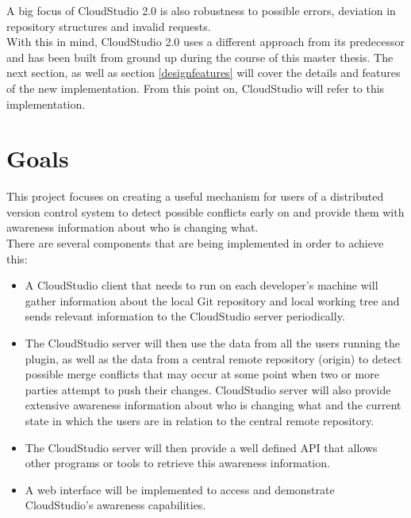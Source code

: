A big focus of CloudStudio 2.0 is also robustness to possible errors, deviation in repository structures and invalid requests. \\

With this in mind, CloudStudio 2.0 uses a different approach from its predecessor and has been built from ground up during the course of this master thesis. The next section, as well as section \ref{designfeatures} will cover the details and features of the new implementation. From this point on, CloudStudio will refer to this implementation.







\section{Goals}




This project focuses on creating a useful mechanism for users of a distributed version control system to detect possible conflicts early on and provide them with awareness information about who is changing what. \\

There are several components that are being implemented in order to achieve this:


\begin{itemize}

\item A CloudStudio client that needs to run on each developer's machine will gather information about the local Git repository and local working tree and sends relevant information to the CloudStudio server periodically.
\item The CloudStudio server will then use the data from all the users running the plugin, as well as the data from a central remote repository (origin) to detect possible merge conflicts that may occur at some point when two or more parties attempt to push their changes. CloudStudio server will also provide extensive awareness information about who is changing what and the current state in which the users are in relation to the central remote repository.
\item The CloudStudio server will then provide a well defined API that allows other programs or tools to retrieve this awareness information.
\item A web interface will be implemented to access and demonstrate CloudStudio's awareness capabilities.

\end{itemize}

